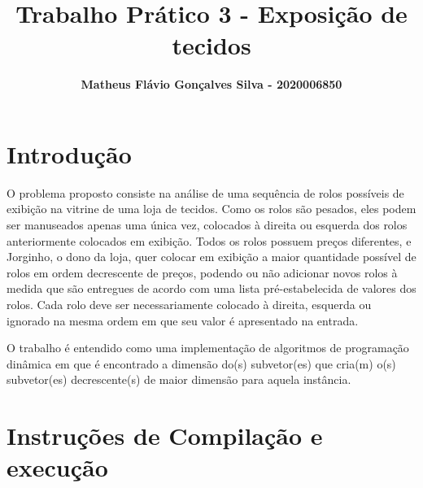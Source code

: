 \documentclass[12pt]{article}
\title{\textbf{Trabalho Prático 3 - Exposição de tecidos}}
\author{\textbf{Matheus Flávio Gonçalves Silva - 2020006850}}
\date{\parbox{\linewidth}{\centering%
    Universidade Federal de Minas Gerais (UFMG)\endgraf
    Belo Horizonte - MG - Brasil\endgraf\bigskip
    \href{mailto:matheusfgs@ufmg.br}{matheusfgs@ufmg.br}}}
\begin{document}
\maketitle

\section{Introdução}
\par O problema proposto consiste na análise de uma sequência de rolos possíveis de exibição na vitrine de uma loja de tecidos. Como os rolos são pesados, eles podem ser manuseados apenas uma única vez, colocados à direita ou esquerda dos rolos anteriormente colocados em exibição. Todos os rolos possuem preços diferentes, e Jorginho, o dono da loja, quer colocar em exibição a maior quantidade possível de rolos em ordem decrescente de preços, podendo ou não adicionar novos rolos à medida que são entregues de acordo com uma lista pré-estabelecida de valores dos rolos. Cada rolo deve ser necessariamente colocado à direita, esquerda ou ignorado na mesma ordem em que seu valor é apresentado na entrada.
\par O trabalho é entendido como uma implementação de algoritmos de programação dinâmica em que é encontrado a dimensão do(s) subvetor(es) que cria(m) o(s) subvetor(es) decrescente(s) de maior dimensão para aquela instância.
    
\section{Instruções de Compilação e execução}
\end{document}

